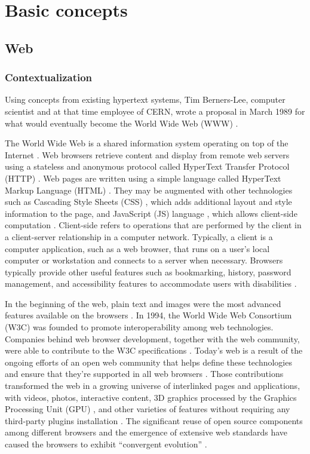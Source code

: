 \chapter{Basic concepts} %
\label{cha:basic_concepts}

\section{Web} %
\label{sec:basic_concepts:web}

\subsection{Contextualization} %
\label{sub:basic_concepts:web:web:contextualization}

Using concepts from existing hypertext systems, Tim Berners-Lee, computer scientist and at that time employee of CERN, wrote a proposal in March 1989 for what would eventually become the World Wide Web (WWW) \cite{WC2006}.

The World Wide Web is a shared information system operating on top of the Internet \cite{WC2006}. Web browsers retrieve content and display from remote web servers using a stateless and anonymous protocol called HyperText Transfer Protocol (HTTP) \cite{WC2006}. Web pages are written using a simple language called HyperText Markup Language (HTML) \cite{WC2006}. They may be augmented with other technologies such as Cascading Style Sheets (CSS) \cite{CSS2013}, which adds additional layout and style information to the page, and JavaScript (JS) language \cite{International2009}, which allows client-side computation \cite{WC2006}. Client-side refers to operations that are performed by the client in a client-server relationship in a computer network. Typically, a client is a computer application, such as a web browser, that runs on a user's local computer or workstation and connects to a server when necessary. Browsers typically provide other useful features such as bookmarking, history, password management, and accessibility features to accommodate users with disabilities \cite{Grosskurth2005}.

In the beginning of the web, plain text and images were the most advanced features available on the browsers \cite{WC2006}. In 1994, the World Wide Web Consortium (W3C) was founded to promote interoperability among web technologies. Companies behind web browser development, together with the web community, were able to contribute to the W3C specifications \cite{WC2006}. Today's web is a result of the ongoing efforts of an open web community that helps define these technologies and ensure that they're supported in all web browsers \cite{Grosskurth2005}. Those contributions transformed the web in a growing universe of interlinked pages and applications, with videos, photos, interactive content, 3D graphics processed by the Graphics Processing Unit (GPU) \cite{WebGL2013}, and other varieties of features without requiring any third-party plugins installation \cite{Hickson2013}. The significant reuse of open source components among different browsers and the emergence of extensive web standards have caused the browsers to exhibit ``convergent evolution'' \cite{Grosskurth2005}.

